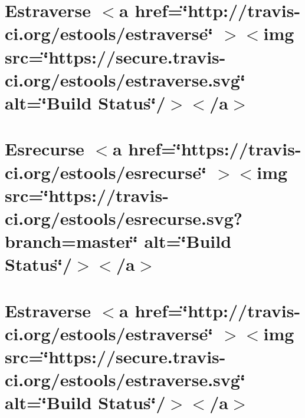 \documentclass[twoside]{book}
\newcommand{\+}{\discretionary{\mbox{\scriptsize$\hookleftarrow$}}{}{}}
\begin{document}
\chapter{Estraverse \texorpdfstring{$<$}{<}a href=\char`\"{}http\+://travis-\/ci.\+org/estools/estraverse\char`\"{} \texorpdfstring{$>$}{>}\texorpdfstring{$<$}{<}img src=\char`\"{}https\+://secure.\+travis-\/ci.\+org/estools/estraverse.\+svg\char`\"{} alt=\char`\"{}\+Build Status\char`\"{}/\texorpdfstring{$>$}{>}\texorpdfstring{$<$}{<}/a\texorpdfstring{$>$}{>}}
\label{md__c___users_vaishnavi_jadhav__desktop__developer_code_mean_stack_example_client_node_modules_e1e90e0d52f9f40f02b2c68ae679849d5}

\chapter{Esrecurse \texorpdfstring{$<$}{<}a href=\char`\"{}https\+://travis-\/ci.\+org/estools/esrecurse\char`\"{} \texorpdfstring{$>$}{>}\texorpdfstring{$<$}{<}img src=\char`\"{}https\+://travis-\/ci.\+org/estools/esrecurse.\+svg?branch=master\char`\"{} alt=\char`\"{}\+Build Status\char`\"{}/\texorpdfstring{$>$}{>}\texorpdfstring{$<$}{<}/a\texorpdfstring{$>$}{>}}
\label{md__c___users_vaishnavi_jadhav__desktop__developer_code_mean_stack_example_client_node_modules_esrecurse__r_e_a_d_m_e}

\chapter{Estraverse \texorpdfstring{$<$}{<}a href=\char`\"{}http\+://travis-\/ci.\+org/estools/estraverse\char`\"{} \texorpdfstring{$>$}{>}\texorpdfstring{$<$}{<}img src=\char`\"{}https\+://secure.\+travis-\/ci.\+org/estools/estraverse.\+svg\char`\"{} alt=\char`\"{}\+Build Status\char`\"{}/\texorpdfstring{$>$}{>}\texorpdfstring{$<$}{<}/a\texorpdfstring{$>$}{>}}
\label{md__c___users_vaishnavi_jadhav__desktop__developer_code_mean_stack_example_client_node_modules_estraverse__r_e_a_d_m_e}

\end{document}
